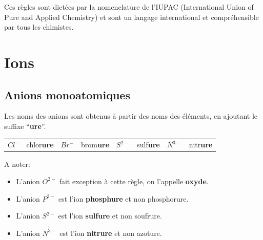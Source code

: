 \documentclass[
  11pt,
  a4paper,
  openany]{book}
\providecommand{\tightlist}{%
  \setlength{\itemsep}{0pt}\setlength{\parskip}{0pt}}
\begin{document}
Ces règles sont dictées par la nomenclature de l'IUPAC (International Union of Pure and Applied Chemistry) et sont un langage international et compréhensible par tous les chimistes.

\section{Ions}\label{ions}

\subsection{Anions monoatomiques}\label{anions-monoatomiques}

Les noms des anions sont obtenus à partir des noms des éléments, en ajoutant le suffixe ``\textbf{ure}''.

\begin{longtable}[]{@{}
  >{\centering\arraybackslash}p{}
  >{\raggedright\arraybackslash}p{}
  >{\centering\arraybackslash}p{}
  >{\raggedright\arraybackslash}p{}
  >{\centering\arraybackslash}p{}
  >{\raggedright\arraybackslash}p{}
  >{\centering\arraybackslash}p{}
  >{\centering\arraybackslash}p{}@{}}
\toprule\noalign{}
\endhead
\bottomrule\noalign{}
\endlastfoot
\(Cl^-\) & chlor\textbf{ure} & \(Br^-\) & brom\textbf{ure} & \(S^{2-}\) & sulf\textbf{ure} & \(N^{3-}\) & nitr\textbf{ure} \\
\end{longtable}

A noter:

\begin{itemize}
\tightlist
\item
  L'anion \(O^{2-}\) fait exception à cette règle, on l'appelle \textbf{oxyde}.
\item
  L'anion \(P^{3-}\) est l'ion \textbf{phosphure} et non phosphorure.
\item
  L'anion \(S^{2-}\) est l'ion \textbf{sulfure} et non soufrure.
\item
  L'anion \(N^{3-}\) est l'ion \textbf{nitrure} et non azoture.
\end{itemize}

\newpage
\end{document}
